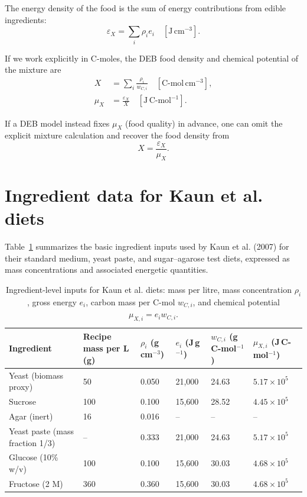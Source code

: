 \documentclass[11pt]{article}
\begin{document}
The energy density of the food is the sum of energy contributions from edible ingredients:
\begin{equation}
  \varepsilon_X = \sum_i \rho_i e_i\quad [\mathrm{J\,cm^{-3}}].
\end{equation}

If we work explicitly in C-moles, the DEB food density and chemical potential of the mixture are
\begin{align}
  X &= \sum_i \frac{\rho_i}{w_{C,i}}\quad [\mathrm{C\text{-}mol\,cm^{-3}}],\\
  \mu_X &= \frac{\varepsilon_X}{X}\quad [\mathrm{J\,C\text{-}mol^{-1}}].
\end{align}

If a DEB model instead fixes $\mu_X$ (food quality) in advance, one can omit the explicit mixture calculation and recover the food density from
\begin{equation}
  X = \frac{\varepsilon_X}{\mu_X}.
\end{equation}

\section{Ingredient data for Kaun et al. diets}

Table~\ref{tab:ingredients} summarizes the basic ingredient inputs used by Kaun et al. (2007) for their standard medium, yeast paste, and sugar--agarose test diets, expressed as mass concentrations and associated energetic quantities.

\begin{table}[h]
\centering
\begin{tabular}{llllll}
\toprule
Ingredient & Recipe mass per L (g) & $\rho_i$ (g\,cm$^{-3}$) & $e_i$ (J\,g$^{-1}$) & $w_{C,i}$ (g\,C-mol$^{-1}$) & $\mu_{X,i}$ (J\,C-mol$^{-1}$) \\
\midrule
Yeast (biomass proxy) & 50 & 0.050 & 21,000 & 24.63 & $5.17\times10^{5}$ \\
Sucrose & 100 & 0.100 & 15,600 & 28.52 & $4.45\times10^{5}$ \\
Agar (inert) & 16 & 0.016 & -- & -- & -- \\
Yeast paste (mass fraction 1/3) & -- & 0.333 & 21,000 & 24.63 & $5.17\times10^{5}$ \\
Glucose (10\% w/v) & 100 & 0.100 & 15,600 & 30.03 & $4.68\times10^{5}$ \\
Fructose (2 M) & 360 & 0.360 & 15,600 & 30.03 & $4.68\times10^{5}$ \\
\bottomrule
\end{tabular}
\caption{Ingredient-level inputs for Kaun et al. diets: mass per litre, mass concentration $\rho_i$, gross energy $e_i$, carbon mass per C-mol $w_{C,i}$, and chemical potential $\mu_{X,i}=e_i w_{C,i}$.}
\label{tab:ingredients}
\end{table}
\end{document}
